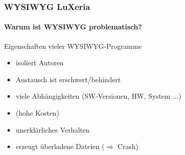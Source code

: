 \begin{frame}
	\frametitle{WYSIWYG \hfill{} \footnotesize{LuXeria}}
	\framesubtitle{Warum ist WYSIWYG problematisch?}
	\begin{alertblock}{Eigenschaften vieler WYSIWYG-Programme}
		\begin{itemize}
			\item isoliert Autoren
			\item Austausch ist erschwert/behindert
			\item viele Abhängigkeiten (SW-Versionen, HW, System ...)
			\item (hohe Kosten)
			\item unerklärliches Verhalten
			\item erzeugt überladene Dateien ($\Rightarrow$ Crash)
		\end{itemize}
	\end{alertblock}
\end{frame}

